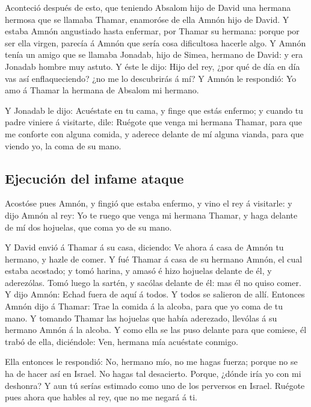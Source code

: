  Aconteció después de esto, que teniendo Absalom hijo de
David una hermana hermosa que se llamaba Thamar, enamoróse de ella Amnón
hijo de David.  Y estaba Amnón angustiado hasta enfermar,
por Thamar su hermana: porque por ser ella virgen, parecía á Amnón que
sería cosa dificultosa hacerle algo.  Y Amnón tenía un
amigo que se llamaba Jonadab, hijo de Simea, hermano de David: y era
Jonadab hombre muy astuto.  Y éste le dijo: Hijo del rey,
¿por qué de día en día vas así enflaqueciendo? ¿no me lo descubrirás á
mí? Y Amnón le respondió: Yo amo á Thamar la hermana de Absalom mi
hermano.

 Y Jonadab le dijo: Acuéstate en tu cama, y finge que
estás enfermo; y cuando tu padre viniere á visitarte, dile: Ruégote que
venga mi hermana Thamar, para que me conforte con alguna comida, y
aderece delante de mí alguna vianda, para que viendo yo, la coma de su
mano.

\hypertarget{ejecuciuxf3n-del-infame-ataque}{%
\subsection{Ejecución del infame
ataque}\label{ejecuciuxf3n-del-infame-ataque}}

 Acostóse pues Amnón, y fingió que estaba enfermo, y vino
el rey á visitarle: y dijo Amnón al rey: Yo te ruego que venga mi
hermana Thamar, y haga delante de mí dos hojuelas, que coma yo de su
mano.

 Y David envió á Thamar á su casa, diciendo: Ve ahora á
casa de Amnón tu hermano, y hazle de comer.  Y fué Thamar
á casa de su hermano Amnón, el cual estaba acostado; y tomó harina, y
amasó é hizo hojuelas delante de él, y aderezólas.  Tomó
luego la sartén, y sacólas delante de él: mas él no quiso comer. Y dijo
Amnón: Echad fuera de aquí á todos. Y todos se salieron de allí.
 Entonces Amnón dijo á Thamar: Trae la comida á la
alcoba, para que yo coma de tu mano. Y tomando Thamar las hojuelas que
había aderezado, llevólas á su hermano Amnón á la alcoba.
 Y como ella se las puso delante para que comiese, él
trabó de ella, diciéndole: Ven, hermana mía acuéstate conmigo.

 Ella entonces le respondió: No, hermano mío, no me hagas
fuerza; porque no se ha de hacer así en Israel. No hagas tal desacierto.
 Porque, ¿dónde iría yo con mi deshonra? Y aun tú serías
estimado como uno de los perversos en Israel. Ruégote pues ahora que
hables al rey, que no me negará á ti.

